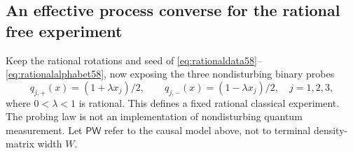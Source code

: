 \subsection{An effective process converse for the rational free experiment}
Keep the rational rotations and seed of
\eqref{eq:rationaldata58}--\eqref{eq:rationalalphabet58}, now exposing the
three nondisturbing binary probes
\begin{equation}\label{eq:weakprobes59}
       q_{j,+}(x)=(1+\lambda x_j)/2,\qquad
       q_{j,-}(x)=(1-\lambda x_j)/2,
       \quad j=1,2,3,
\end{equation}
where $0<\lambda<1$ is rational. This defines a fixed rational classical
experiment. The probing law is not an implementation of nondisturbing
quantum measurement. Let $\mathsf{PW}$ refer to the causal model above,
not to terminal density-matrix width $W$.

